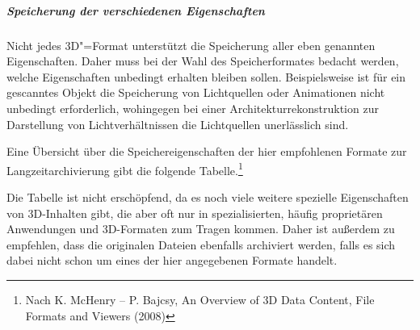 \subparagraph{Speicherung der verschiedenen Eigenschaften}
Nicht jedes 3D"=Format unterstützt die Speicherung aller eben genannten Eigenschaften. Daher muss bei der Wahl des Speicherformates bedacht werden, welche Eigenschaften unbedingt erhalten bleiben sollen. Beispielsweise ist für ein gescanntes Objekt die Speicherung von Lichtquellen oder Animationen nicht unbedingt erforderlich, wohingegen bei einer Architekturrekonstruktion zur Darstellung von Lichtverhältnissen die Lichtquellen unerlässlich sind.

Eine Übersicht über die Speichereigenschaften der hier empfohlenen Formate zur Langzeitarchivierung gibt die folgende Tabelle.\footnote{Nach K. McHenry -- P. Bajcsy, An Overview of 3D Data Content, File Formats and Viewers (2008)}

Die Tabelle ist nicht erschöpfend, da es noch viele weitere spezielle Eigenschaften von 3D-Inhalten gibt, die aber oft nur in spezialisierten, häufig proprietären Anwendungen und 3D-Formaten zum Tragen kommen. Daher ist außerdem zu empfehlen, dass die originalen Dateien ebenfalls archiviert werden, falls es sich dabei nicht schon um eines der hier angegebenen Formate handelt.

